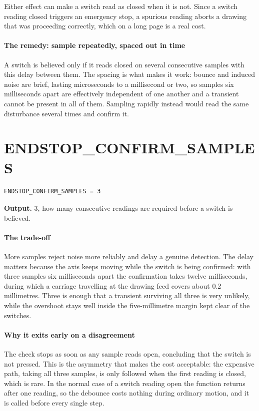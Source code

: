 Either effect can make a switch read as closed when it is not. Since a switch reading closed triggers an emergency stop, a spurious reading aborts a drawing that was proceeding correctly, which on a long page is a real cost.


\paragraph{The remedy: sample repeatedly, spaced out in time}
A switch is believed only if it reads closed on several consecutive samples with this delay between them. The spacing is what makes it work: bounce and induced noise are brief, lasting microseconds to a millisecond or two, so samples six milliseconds apart are effectively independent of one another and a transient cannot be present in all of them. Sampling rapidly instead would read the same disturbance several times and confirm it.


\section{ENDSTOP\_CONFIRM\_SAMPLES}
\begin{lstlisting}[style=sig]
ENDSTOP_CONFIRM_SAMPLES = 3
\end{lstlisting}

\noindent\textbf{Output.} 3, how many consecutive readings are required before a switch is believed.


\paragraph{The trade-off}
More samples reject noise more reliably and delay a genuine detection. The delay matters because the axis keeps moving while the switch is being confirmed: with three samples six milliseconds apart the confirmation takes twelve milliseconds, during which a carriage travelling at the drawing feed covers about 0.2 millimetres. Three is enough that a transient surviving all three is very unlikely, while the overshoot stays well inside the five-millimetre margin kept clear of the switches.


\paragraph{Why it exits early on a disagreement}
The check stops as soon as any sample reads open, concluding that the switch is not pressed. This is the asymmetry that makes the cost acceptable: the expensive path, taking all three samples, is only followed when the first reading is closed, which is rare. In the normal case of a switch reading open the function returns after one reading, so the debounce costs nothing during ordinary motion, and it is called before every single step.


